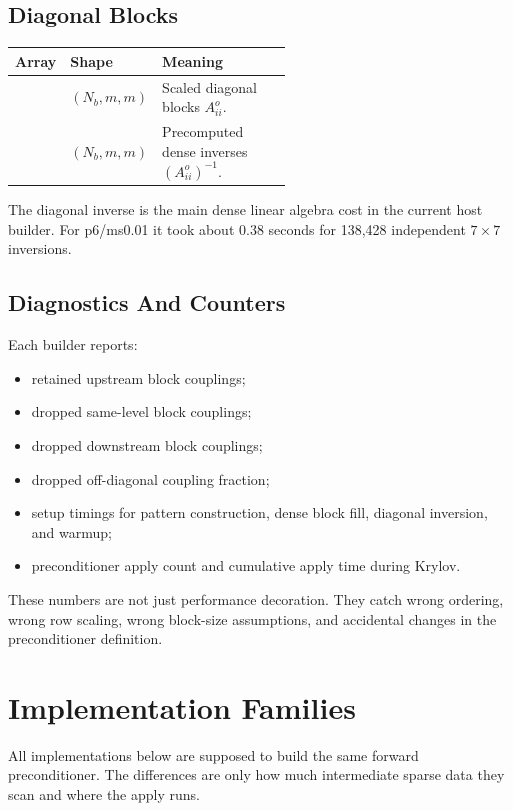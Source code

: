 \documentclass[11pt]{article}
\newcommand{\code}[1]{\texttt{\detokenize{#1}}}
\begin{document}
\subsection{Diagonal Blocks}

\begin{center}
\begin{tabular}{llp{0.55\linewidth}}
\toprule
Array & Shape & Meaning \\
\midrule
\code{diagonal_blocks} & \((N_b,m,m)\) & Scaled diagonal blocks \(A^o_{ii}\). \\
\code{diagonal_inverse} & \((N_b,m,m)\) & Precomputed dense inverses \((A^o_{ii})^{-1}\). \\
\bottomrule
\end{tabular}
\end{center}

The diagonal inverse is the main dense linear algebra cost in the current host
builder.  For p6/ms0.01 it took about 0.38 seconds for 138,428 independent
\(7\times7\) inversions.

\subsection{Diagnostics And Counters}

Each builder reports:
\begin{itemize}[nosep]
  \item retained upstream block couplings;
  \item dropped same-level block couplings;
  \item dropped downstream block couplings;
  \item dropped off-diagonal coupling fraction;
  \item setup timings for pattern construction, dense block fill, diagonal
        inversion, and warmup;
  \item preconditioner apply count and cumulative apply time during Krylov.
\end{itemize}
These numbers are not just performance decoration.  They catch wrong ordering,
wrong row scaling, wrong block-size assumptions, and accidental changes in the
preconditioner definition.

\section{Implementation Families}
\label{sec:implementations}

All implementations below are supposed to build the same forward
preconditioner.  The differences are only how much intermediate sparse data
they scan and where the apply runs.
\end{document}

